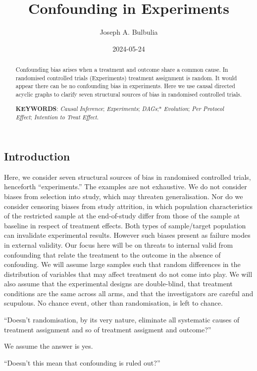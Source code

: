 \documentclass[
  single column]{article}
\title{Confounding in Experiments}
\author{Joseph A. Bulbulia}
\affil{%
             \small{     Victoria University of Wellington, New Zealand
          ORCID \textcolor[HTML]{A6CE39}{\aiOrcid} ~0000-0002-5861-2056 }
              }
\date{2024-05-24}
\begin{document}
\maketitle
\begin{abstract}
Confounding bias arises when a treatment and outcome share a common
cause. In randomised controlled trials (Experiments) treatment
assignment is random. It would appear there can be no confounding bias
in experiments. Here we use causal directed acyclic graphs to clarify
seven structural sources of bias in randomised controlled trials.

\textbf{KEYWORDS}: \emph{Causal Inference}; \emph{Experiments};
\emph{DAGs};* \emph{Evolution}; \emph{Per Protocol Effect};
\emph{Intention to Treat Effect}.
\end{abstract}

\subsection{Introduction}\label{introduction}

Here, we consider seven structural sources of bias in randomised
controlled trials, henceforth ``experiments.'' The examples are not
exhaustive. We do not consider biases from selection into study, which
may threaten generalisation. Nor do we consider censoring biases from
study attrition, in which population characteristics of the restricted
sample at the end-of-study differ from those of the sample at baseline
in respect of treatment effects. Both types of sample/target population
can invalidate experimental results. However such biases present as
failure modes in external validity. Our focus here will be on threats to
internal valid from confounding that relate the treatment to the outcome
in the absence of confouding. We will assume large samples such that
random differences in the distribution of variables that may affect
treatment do not come into play. We will also assume that the
experimental designs are double-blind, that treatment conditions are the
same across all arms, and that the investigators are careful and
scupulous. No chance event, other than randomisation, is left to chance.

``Doesn't randomisation, by its very nature, eliminate all systematic
causes of treatment assignment and so of treatment assigment and
outcome?''

We assume the answer is yes.

``Doesn't this mean that confounding is ruled out?''
\end{document}
